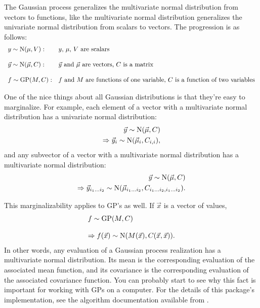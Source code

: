 \documentclass{manual}
\begin{document}
The Gaussian process generalizes the multivariate normal distribution from vectors to functions, like the multivariate normal distribution generalizes the univariate normal distribution from scalars to vectors. The progression is as follows:
\begin{equation}
    \begin{array}{ll}
        y\sim\textup N(\mu,V): & \textup{$y$, $\mu$, $V$ are scalars}\\\\
        \vec y\sim\textup N(\vec \mu,C): & \textup{$\vec y$ and $\vec \mu$ are vectors, $C$ is a matrix}\\\\
        f\sim\textup{GP}(M, C): & \textup{$f$ and $M$ are functions of one variable, $C$ is a function of two variables}
    \end{array}
\end{equation}

One of the nice things about all Gaussian distributions is that they're easy to marginalize. For example, each element of a vector with a multivariate normal distribution has a univariate normal distribution:
\begin{eqnarray*}
    \vec y\sim\textup N(\vec \mu,C)\\
    \Rightarrow \vec y_i\sim\textup N(\vec \mu_i,C_{i,i}),
\end{eqnarray*}
and any subvector of a vector with a multivariate normal distribution has a multivariate normal distribution:
\begin{eqnarray*}
    \vec y\sim\textup N(\vec \mu,C)\\
    \Rightarrow \vec y_{i_1\ldots i_2}\sim\textup N(\vec \mu_{i_1\ldots i_2},C_{i_1\ldots i_2,i_1\ldots i_2}).
\end{eqnarray*}

This marginalizability applies to GP's as well. If $\vec x$ is a vector of values,
\begin{equation}
    \begin{array}{l}
        f\sim\textup{GP}(M, C)\\\\
        \Rightarrow f(\vec x) \sim\textup N(M(\vec x), C(\vec x,\vec x)).
    \end{array}
\end{equation}
In other words, any evaluation of a Gaussian process realization has a multivariate normal distribution. Its mean is the corresponding evaluation of the associated mean function, and its covariance is the corresponding evaluation of the associated covariance function. You can probably start to see why this fact is important for working with GPs on a computer. For the details of this package's implementation, see the algorithm documentation available from .
\end{document}
